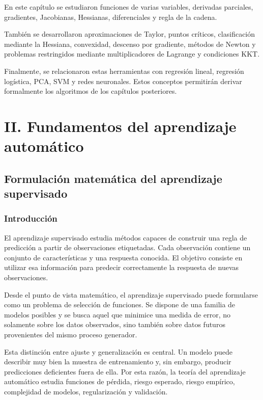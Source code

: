 \documentclass[
  spanish,
  11pt,
  letterpaper,
  DIV=11,
  numbers=noendperiod]{scrreprt}
\theoremstyle{definition}
\theoremstyle{plain}
\theoremstyle{definition}
\theoremstyle{remark}
\begin{document}
En este capítulo se estudiaron funciones de varias variables, derivadas
parciales, gradientes, Jacobianas, Hessianas, diferenciales y regla de
la cadena.

También se desarrollaron aproximaciones de Taylor, puntos críticos,
clasificación mediante la Hessiana, convexidad, descenso por gradiente,
métodos de Newton y problemas restringidos mediante multiplicadores de
Lagrange y condiciones KKT.

Finalmente, se relacionaron estas herramientas con regresión lineal,
regresión logística, PCA, SVM y redes neuronales. Estos conceptos
permitirán derivar formalmente los algoritmos de los capítulos
posteriores.

\part{II. Fundamentos del aprendizaje automático}

\chapter{Formulación matemática del aprendizaje
supervisado}\label{sec-aprendizaje-supervisado}

\section{Introducción}\label{introducciuxf3n-5}

El aprendizaje supervisado estudia métodos capaces de construir una
regla de predicción a partir de observaciones etiquetadas. Cada
observación contiene un conjunto de características y una respuesta
conocida. El objetivo consiste en utilizar esa información para predecir
correctamente la respuesta de nuevas observaciones.

Desde el punto de vista matemático, el aprendizaje supervisado puede
formularse como un problema de selección de funciones. Se dispone de una
familia de modelos posibles y se busca aquel que minimice una medida de
error, no solamente sobre los datos observados, sino también sobre datos
futuros provenientes del mismo proceso generador.

Esta distinción entre ajuste y generalización es central. Un modelo
puede describir muy bien la muestra de entrenamiento y, sin embargo,
producir predicciones deficientes fuera de ella. Por esta razón, la
teoría del aprendizaje automático estudia funciones de pérdida, riesgo
esperado, riesgo empírico, complejidad de modelos, regularización y
validación.
\end{document}
